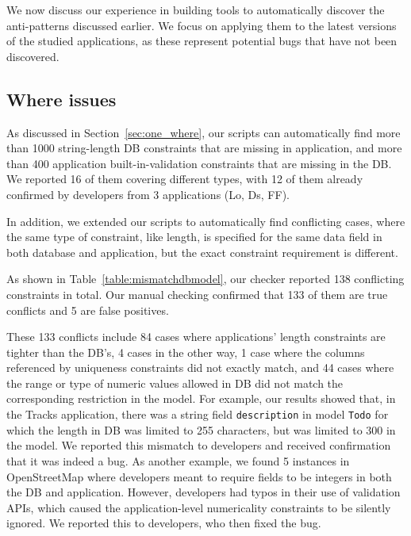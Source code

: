  

We now discuss our experience in building tools to automatically discover the anti-patterns discussed earlier. We focus on applying them to the latest versions of the studied applications, as these represent potential bugs that have not been discovered.

\subsection{Where issues}

As discussed in Section~\ref{sec:one_where}, our scripts can automatically find more than 1000 string-length DB constraints that are missing in application, and more than 400 application built-in-validation constraints
 that are missing in the DB. We reported 16 of them covering different types, with 12 of them already confirmed by developers from 3 applications (Lo, Ds, FF).

In addition, we extended our scripts to automatically find conflicting cases, where
the same type of constraint, like length, is specified for the same 
data field in both database and application, but the exact constraint requirement is different.

As shown in Table~\ref{table:mismatchdbmodel}, our checker reported 138 conflicting constraints in total.
Our manual checking confirmed that 133 of them are true conflicts and 5 are false positives.

These 133 conflicts include 84 cases where
applications' length constraints are tighter than the DB's, 4 cases in the other way, 1 case where the columns referenced by uniqueness constraints did not exactly match, and 44 cases where the range or type of numeric values allowed in DB did not match the corresponding restriction in the model. 
For example, our results showed that, in the Tracks application, there was a string field {\tt description} in model {\tt Todo} for which the length in DB was limited to 255 characters, but was limited to 300 in the model. 
We reported this mismatch to developers and received confirmation that it was indeed a bug. 
As another example, we found 5 instances in OpenStreetMap where developers meant to require 
fields to be integers in both the DB and application. However, developers had typos in their use of validation APIs, which caused the application-level numericality constraints to be silently ignored. 
We reported this to developers, who then fixed the bug.

